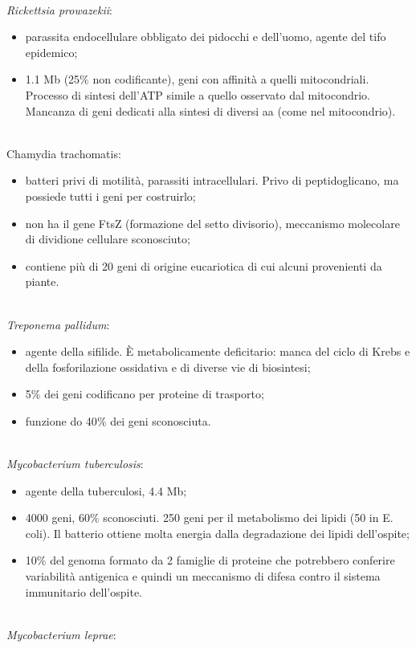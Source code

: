 \\\textit{Rickettsia prowazekii}:
\begin{itemize}
    \item parassita endocellulare obbligato dei pidocchi e dell'uomo, agente del tifo epidemico; \item 1.1 Mb (25$\%$ non codificante), geni con affinit\`a a quelli mitocondriali. Processo di sintesi dell'ATP simile a quello osservato dal mitocondrio. Mancanza di geni dedicati alla sintesi di diversi aa (come nel mitocondrio).
\end{itemize}
\\\textit{}{Chamydia trachomatis}:
\begin{itemize}
    \item batteri privi di motilit\`a, parassiti intracellulari. Privo di peptidoglicano, ma possiede tutti i geni per costruirlo;
    \item non ha il gene FtsZ (formazione del setto divisorio), meccanismo molecolare di dividione cellulare sconosciuto;
    \item contiene pi\`u di 20 geni di origine eucariotica di cui alcuni provenienti da piante.
\end{itemize}
\\\textit{Treponema pallidum}:
\begin{itemize}
    \item agente della sifilide. \`E metabolicamente deficitario: manca del ciclo di Krebs e della fosforilazione ossidativa e di diverse vie di biosintesi; 
    \item 5$\%$ dei geni codificano per proteine di trasporto; 
    \item funzione do 40$\%$ dei geni sconosciuta. 
\end{itemize}
\\\textit{Mycobacterium tuberculosis}:
\begin{itemize}
    \item agente della tuberculosi, 4.4 Mb; 
    \item 4000 geni, 60$\%$ sconosciuti. 250 geni per il metabolismo dei lipidi (50 in E. coli). Il batterio ottiene molta energia dalla degradazione dei lipidi dell'ospite; 
    \item 10$\%$ del genoma formato da 2 famiglie di proteine che potrebbero conferire variabilit\`a antigenica e quindi un meccanismo di difesa contro il sistema immunitario dell'ospite.
\end{itemize}
\\\textit{Mycobacterium leprae}:
